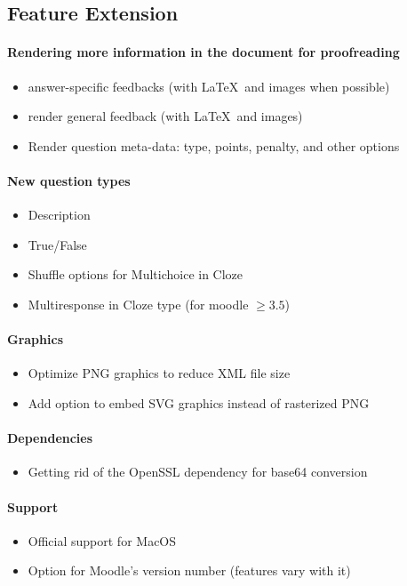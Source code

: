 \documentclass[twocolumn,a4paper,9pt]{article}
\begin{document}
\subsection{Feature Extension}

\paragraph{Rendering more information in the document for proofreading}
\begin{itemize}
	\item answer-specific feedbacks (with \LaTeX\ and images when possible)
	\item render general feedback (with \LaTeX\ and images)
	\item Render question meta-data: type, points, penalty, and other options
\end{itemize}

\paragraph{New question types}
\begin{itemize}
	\item Description
	\item True/False
	\item Shuffle options for Multichoice in Cloze
	\item Multiresponse in Cloze type (for moodle $\geq 3.5$)
\end{itemize}

\paragraph{Graphics}
\begin{itemize}
	\item Optimize PNG graphics to reduce XML file size
	\item Add option to embed SVG graphics instead of rasterized PNG
\end{itemize}

\paragraph{Dependencies}
\begin{itemize}
	\item Getting rid of the OpenSSL dependency for base64 conversion
\end{itemize}

\paragraph{Support}
\begin{itemize}
	\item Official support for MacOS
	\item Option for Moodle's version number (features vary with it)
\end{itemize}
\end{document}
